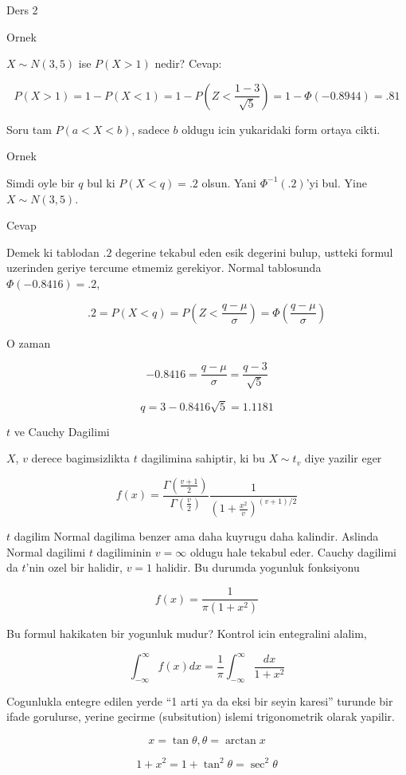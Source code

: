\documentclass[12pt,fleqn]{article}\usepackage{../common}
\begin{document}
Ders 2

Ornek 

$X \sim N(3,5)$ ise $P(X > 1)$ nedir? Cevap:

\[ P(X>1) = 1 - P(X < 1) = 1 - P( Z < \frac{ 1 - 3}{\sqrt{5 }}) = 
1 - \Phi(-0.8944) = .81
 \]

Soru tam $P(a  < X < b)$, sadece $b$ oldugu icin yukaridaki form ortaya
cikti. 

Ornek 

Simdi oyle bir $q$ bul ki $P(X < q) = .2$ olsun. Yani $\Phi^{-1}(.2)$'yi
bul. Yine $X \sim N(3,5)$. 

Cevap 

Demek ki tablodan $.2$ degerine tekabul eden esik degerini bulup, ustteki
formul uzerinden geriye tercume etmemiz gerekiyor. Normal tablosunda
$\Phi(-0.8416) = .2$, 

\[ .2 = P(X<q) = P( Z < \frac{ q - \mu}{\sigma}) = \Phi(\frac{ q - \mu}{\sigma})
\]

O zaman 

\[ -0.8416 = \frac{q - \mu}{\sigma} = \frac{ q - 3}{\sqrt{ 5}} \]

\[ q = 3 - 0.8416 \sqrt{ 5} = 1.1181 \]

$t$ ve Cauchy Dagilimi 

$X$, $v$ derece bagimsizlikta $t$ dagilimina sahiptir, ki bu $X \sim t_v$
diye yazilir eger 

\[ f(x) = \frac{ \Gamma(\frac{ v+1}{2})} {\Gamma(\frac{ v}{2})}
\frac{ 1}{(1 + \frac{ x^2}{v})^{(v+1) / 2}}
 \]

$t$ dagilim Normal dagilima benzer ama daha kuyrugu daha kalindir. Aslinda
Normal dagilimi $t$ dagiliminin $v = \infty$ oldugu hale tekabul
eder. Cauchy dagilimi da $t$'nin ozel bir halidir, $v = 1$ halidir. Bu
durumda yogunluk fonksiyonu

\[ f(x)  = \frac{ 1}{\pi(1+ x^2)} \]

Bu formul hakikaten bir yogunluk mudur? Kontrol icin entegralini alalim, 

\[ \int _{ -\infty}^{\infty} f(x) dx = 
\frac{ 1}{\pi} \int _{ -\infty}^{\infty} \frac{ dx}{1 + x^2} 
 \]

Cogunlukla entegre edilen yerde  ``1 arti ya da eksi bir seyin karesi''
turunde  bir ifade gorulurse, yerine gecirme (subsitution) islemi
trigonometrik  olarak  yapilir. 

\[  x = \tan \theta, \theta = \arctan x \]

\[ 1 + x^2 = 1 + \tan^2\theta = \sec^2\theta\]
\end{document}

